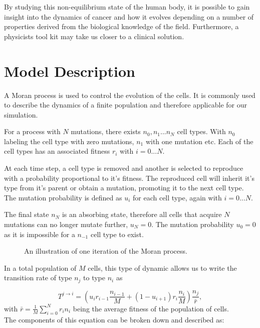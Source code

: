 \documentclass[12pt, a4paper,]{article}
\let\cite=\supercite
\begin{document}
By studying this non-equilibrium state of the human body, it is possible to gain insight into the dynamics of cancer and how it evolves depending on a number of properties derived from the biological knowledge of the field. Furthermore, a physicists tool kit may take us closer to a clinical solution. 

\section{Model Description}

A Moran process is used to control the evolution of the cells. It is commonly used to describe the dynamics of a finite population \cite{moran_random_1958} and therefore applicable for our simulation.  

For a process with $N$ mutations, there exists $n_0, n_1 ... n_N$ cell types. With $n_0$ labeling the cell type with zero mutations, $n_1$ with one mutation etc. Each of the cell types has an associated fitness $r_i$ with $i = 0...N$. 

At each time step, a cell type is removed and another is selected to reproduce with a probability proportional to it's fitness. The reproduced cell will inherit it's type from it's parent or obtain a mutation, promoting it to the next cell type. 
The mutation probability is defined as $u_i$ for each cell type, again with $i = 0...N$. 

The final state $n_N$ is an absorbing state, therefore all cells that acquire $N$ mutations can no longer mutate further, $u_N = 0$. The mutation probability $u_0 = 0$ as it is impossible for a $n_{-1}$ cell type to exist.  

\begin{figure}[H]
\centering 

\caption{An illustration of one iteration of the Moran process.}
\end{figure}

In a total population of $M$ cells, this type of dynamic allows us to write the transition rate of type $n_j$ to type $n_i$ as 

\begin{equation}
T^{j \rightarrow i } = \left( u_i r_{i-1} \frac{n_{i-1}}{M} + (1- u_{i+1} ) r _i \frac{n_i}{M} \right) \frac{n_j}{\bar{r}},
\label{eq:TransRate}
\end{equation}
with $\bar{r} = \frac{1}{M} \sum _{i=0} ^{N} r_i n_i $ being the average fitness of the population of cells. 
\\
The components of this equation can be broken down and described as:
\end{document}
